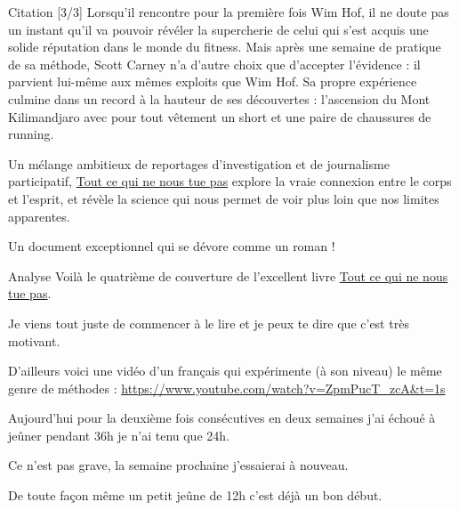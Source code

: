\documentclass[presentation]{beamer}
\begin{document}
\begin{frame}[label={sec:org4600d17}]{Citation [3/3]}
Lorsqu'il rencontre pour la première fois Wim Hof, il ne doute pas un instant qu'il va pouvoir révéler la supercherie de celui qui s'est acquis une solide réputation dans le monde du fitness. Mais après une semaine de pratique de sa méthode, Scott Carney n'a d'autre choix que d'accepter l'évidence : il parvient lui-même aux mêmes exploits que Wim Hof. Sa propre expérience culmine dans un record à la hauteur de ses découvertes : l'ascension du Mont Kilimandjaro avec pour tout vêtement un short et une paire de chaussures de running.

Un mélange ambitieux de reportages d'investigation et de journalisme participatif, \href{https://amzn.to/2Uveetk}{Tout ce qui ne nous tue pas} explore la vraie connexion entre le corps et l'esprit, et révèle la science qui nous permet de voir plus loin que nos limites apparentes.

Un document exceptionnel qui se dévore comme un roman !
\end{frame}


\begin{frame}[label={sec:orgb560639}]{Analyse}
Voilà le quatrième de couverture de l'excellent livre \href{https://amzn.to/2Uveetk}{Tout ce qui ne nous tue pas}.



Je viens tout juste de commencer à le lire et je peux te dire que c'est très motivant. 



D'ailleurs voici une vidéo d'un français qui expérimente (à son niveau) le même genre de méthodes : \url{https://www.youtube.com/watch?v=ZpmPucT\_zcA\&t=1s}



Aujourd'hui pour la deuxième fois consécutives en deux semaines j'ai échoué à jeûner pendant 36h je n'ai tenu que 24h.



Ce n'est pas grave, la semaine prochaine j'essaierai à nouveau.



De toute façon même un petit jeûne de 12h c'est déjà un bon début.
\end{frame}
\end{document}
